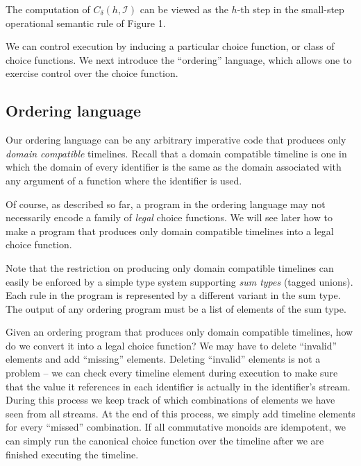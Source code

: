 The computation of $C_\delta(h, \mathcal{I})$ can be viewed as the $h$-th step in the small-step operational semantic rule of Figure 1.

We can control execution by inducing a particular choice function, or class of choice functions.  We next introduce the ``ordering'' language, which allows one to exercise control over the choice function.


\subsection{Ordering language}

Our ordering language can be any arbitrary imperative code that produces only {\em domain compatible} timelines.  Recall that a domain compatible timeline is one in which the domain of every identifier is the same as the domain associated with any argument of a function where the identifier is used.

Of course, as described so far, a program in the ordering language may not necessarily encode a family of {\em legal} choice functions.  We will see later how to make a program that produces only domain compatible timelines into a legal choice function.

Note that the restriction on producing only domain compatible timelines can easily be enforced by a simple type system supporting {\em sum types} (tagged unions).  Each rule in the program is represented by a different variant in the sum type.  The output of any ordering program must be a list of elements of the sum type.

Given an ordering program that produces only domain compatible timelines, how do we convert it into a legal choice function?  We may have to delete ``invalid'' elements and add ``missing'' elements.  Deleting ``invalid'' elements is not a problem -- we can check every timeline element during execution to make sure that the value it references in each identifier is actually in the identifier's stream.  During this process we keep track of which combinations of elements we have seen from all streams.  At the end of this process, we simply add timeline elements for every ``missed'' combination.  If all commutative monoids are idempotent, we can simply run the canonical choice function over the timeline after we are finished executing the timeline.


